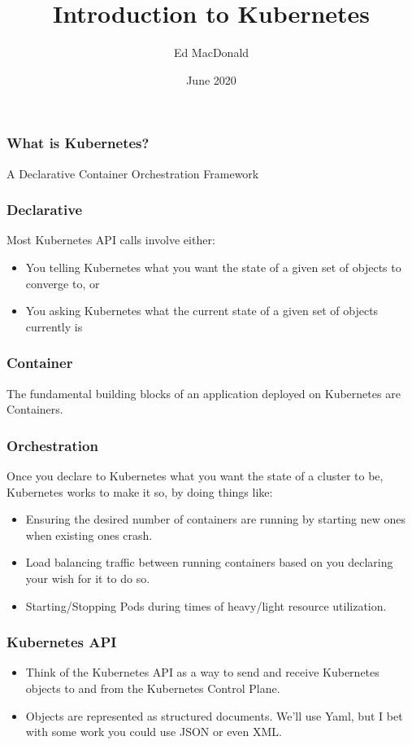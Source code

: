 \documentclass{beamer}
\title[Kubernetes]{Introduction to Kubernetes}
\author{Ed MacDonald}
\institute{Solution Street}
\date{June 2020}
\begin{document}
\frame{\titlepage}

\begin{frame}
\frametitle{What is Kubernetes?}
A Declarative Container Orchestration Framework
\end{frame}

\begin{frame}
\frametitle{Declarative}
Most Kubernetes API calls involve either:
\begin{itemize}
    \item You telling Kubernetes what you want the state of a given set of objects to converge to, or
    \item You asking Kubernetes what the current state of a given set of objects currently is
\end{itemize}
\end{frame}

\begin{frame}
\frametitle{Container}
The fundamental building blocks of an application deployed on Kubernetes are Containers.
\end{frame}

\begin{frame}
\frametitle{Orchestration}
Once you declare to Kubernetes what you want the state of a cluster to be, Kubernetes works to make it so, by doing things like:
\begin{itemize}
    \item Ensuring the desired number of containers are running by starting new ones when existing ones crash.
    \item Load balancing traffic between running containers based on you declaring your wish for it to do so.
    \item Starting/Stopping Pods during times of heavy/light resource utilization.
\end{itemize}
\end{frame}

\begin{frame}
\frametitle{Kubernetes API}
\begin{itemize}
    \item Think of the Kubernetes API as a way to send and receive Kubernetes objects to and from the Kubernetes Control Plane.
    \item Objects are represented as structured documents. We'll use Yaml, but I bet with some work you could use JSON or even XML.
\end{itemize}
\end{frame}
\end{document}
